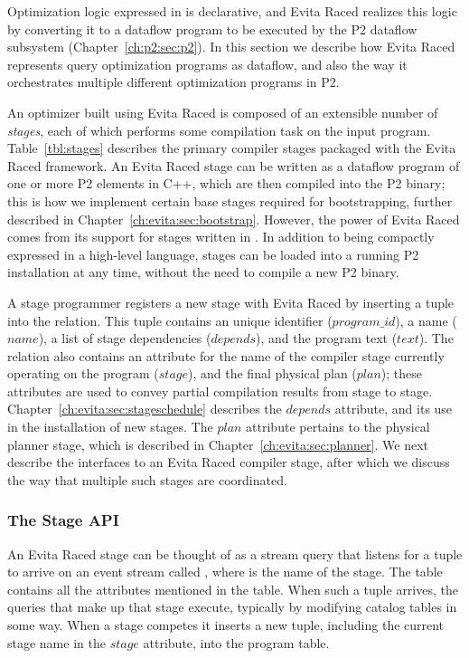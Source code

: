 Optimization logic expressed in \OVERLOG is declarative, and Evita Raced
realizes this logic by converting it to a dataflow program to be executed by
the P2 dataflow subsystem (Chapter~\ref{ch:p2:sec:p2}).  In this section we
describe how Evita Raced represents query optimization programs as dataflow,
and also the way it orchestrates multiple different optimization programs
in P2.

An optimizer built using Evita Raced is composed of an extensible number of
{\em stages}, each of which performs some compilation task on the input
program.  Table~\ref{tbl:stages} describes the primary compiler stages packaged
with the Evita Raced framework.  An Evita Raced stage can be written as a
dataflow program of one or more P2 elements in C++, which are then compiled
into the P2 binary; this is how we implement certain base stages required for
bootstrapping, further described in Chapter~\ref{ch:evita:sec:bootstrap}.
However, the power of Evita Raced comes from its support for stages written in
\OVERLOG.  In addition to being compactly expressed in a high-level language,
\OVERLOG stages can be loaded into a running P2 installation at any time,
without the need to compile a new P2 binary.

A stage programmer registers a new stage with Evita Raced by inserting a tuple
into the  relation.  This tuple contains an unique identifier
($program\_id$), a name ($name$), a list of stage dependencies ($depends$), and
the program text ($text$).  The  relation also contains an
attribute for the name of the compiler stage currently operating on the program
($stage$), and the final physical plan ($plan$); these attributes are used to
convey partial compilation results from stage to stage.
Chapter~\ref{ch:evita:sec:stageschedule} describes the $depends$ attribute, and
its use in the installation of new stages.  The $plan$ attribute pertains to
the physical planner stage, which is described in
Chapter~\ref{ch:evita:sec:planner}.  We next describe the interfaces to an
Evita Raced compiler stage, after which we discuss the way that multiple such
stages are coordinated.

\subsubsection{The Stage API}
\label{ch:evita:sec:stages}

An Evita Raced stage can be thought of as a stream query that listens for a
tuple to arrive on an event stream called , where
 is the name of the stage.  The  table
contains all the attributes mentioned in the  table.  When such a
tuple arrives, the queries that make up that stage execute, typically by
modifying catalog tables in some way.  When a stage competes it inserts a new
 tuple, including the current stage name in the $stage$ attribute,
into the program table.

